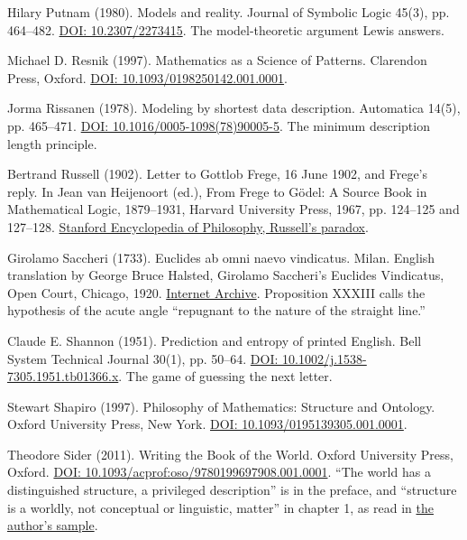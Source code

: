\documentclass[11pt,twoside]{article}
\theoremstyle{thielethm}
\theoremstyle{thieledef}
\theoremstyle{thieledef}
\theoremstyle{thieledef}
\theoremstyle{thielethm}
\theoremstyle{thieleobs}
\theoremstyle{thielethm}
\begin{document}
\noindent Hilary Putnam (1980). Models and reality. Journal of Symbolic Logic 45(3), pp. 464--482. \href{https://doi.org/10.2307/2273415}{DOI: 10.2307/2273415}. The model-theoretic argument Lewis answers.
\par\medskip

\noindent Michael D. Resnik (1997). Mathematics as a Science of Patterns. Clarendon Press, Oxford. \href{https://doi.org/10.1093/0198250142.001.0001}{DOI: 10.1093/0198250142.001.0001}.
\par\medskip

\noindent Jorma Rissanen (1978). Modeling by shortest data description. Automatica 14(5), pp. 465--471. \href{https://doi.org/10.1016/0005-1098(78)90005-5}{DOI: 10.1016/0005-1098(78)90005-5}. The minimum description length principle.
\par\medskip

\noindent Bertrand Russell (1902). Letter to Gottlob Frege, 16 June 1902, and Frege's reply. In Jean van Heijenoort (ed.), From Frege to G\"odel: A Source Book in Mathematical Logic, 1879--1931, Harvard University Press, 1967, pp. 124--125 and 127--128. \href{https://plato.stanford.edu/entries/russell-paradox/}{Stanford Encyclopedia of Philosophy, Russell's paradox}.
\par\medskip

\noindent Girolamo Saccheri (1733). Euclides ab omni naevo vindicatus. Milan. English translation by George Bruce Halsted, Girolamo Saccheri's Euclides Vindicatus, Open Court, Chicago, 1920. \href{https://archive.org/details/girolamosacceri00saccuoft}{Internet Archive}. Proposition XXXIII calls the hypothesis of the acute angle ``repugnant to the nature of the straight line.''
\par\medskip

\noindent Claude E. Shannon (1951). Prediction and entropy of printed English. Bell System Technical Journal 30(1), pp. 50--64. \href{https://doi.org/10.1002/j.1538-7305.1951.tb01366.x}{DOI: 10.1002/j.1538-7305.1951.tb01366.x}. The game of guessing the next letter.
\par\medskip

\noindent Stewart Shapiro (1997). Philosophy of Mathematics: Structure and Ontology. Oxford University Press, New York. \href{https://doi.org/10.1093/0195139305.001.0001}{DOI: 10.1093/0195139305.001.0001}.
\par\medskip

\noindent Theodore Sider (2011). Writing the Book of the World. Oxford University Press, Oxford. \href{https://doi.org/10.1093/acprof:oso/9780199697908.001.0001}{DOI: 10.1093/acprof:oso/9780199697908.001.0001}. ``The world has a distinguished structure, a privileged description'' is in the preface, and ``structure is a worldly, not conceptual or linguistic, matter'' in chapter 1, as read in \href{https://www.tedsider.org/books/wbotw_sample.pdf}{the author's sample}.
\par\medskip
\end{document}
